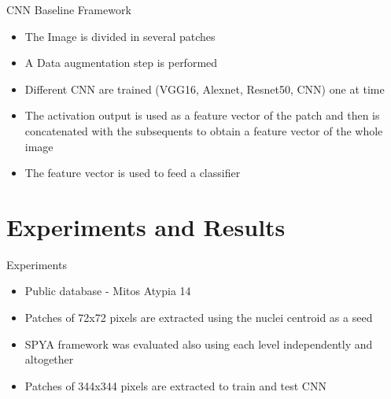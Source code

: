 \documentclass[usenames,dvipsnames]{beamer}
\begin{document}
\begin{frame}{CNN Baseline Framework}
\begin{itemize}
 \item The Image is divided in several patches
 \pause
 \item A Data augmentation step is performed

 \pause \item Different CNN are trained (VGG16, Alexnet, Resnet50, CNN) one at time
  \pause\item The activation output is used as a feature vector of the patch and then is concatenated with the subsequents to obtain a feature vector of the whole image
  \pause \item The feature vector is used to feed a classifier
\end{itemize}
\end{frame}

\section{Experiments and Results}

\begin{frame}{Experiments }
\begin{itemize}
\item Public database - Mitos Atypia 14
\item  Patches of 72x72 pixels are extracted using the nuclei centroid as a seed
\item SPYA framework was evaluated also using each level independently and altogether
\item Patches of 344x344 pixels are extracted to train and test CNN

 
\end{itemize}

\end{frame}
\end{document}
